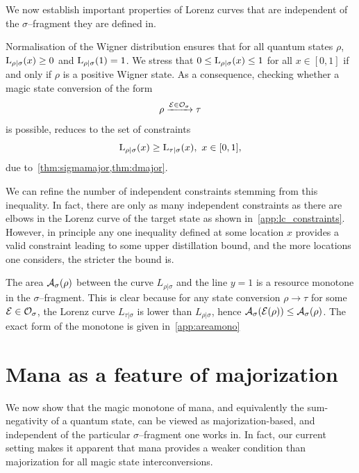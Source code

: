 \documentclass[pra,
aps,
twocolumn,
superscriptaddress,
groupedaddress,
nofootinbib,
reprint
]{revtex4-1}
\begin{document}
We now establish important properties of Lorenz curves that are independent of the $\sigma$--fragment they are defined in.

Normalisation of the Wigner distribution  ensures that for all quantum states $\rho$, ${{\rm{L}}_{\rho|\sigma}}(x) \geq 0$ and ${{\rm{L}}_{\rho|\sigma}}(1) = 1$.
We stress that $0 \leq {{\rm{L}}_{\rho|\sigma}}(x) \leq 1$ for all $x \in [0,1]$ if and only if $\rho$ is a positive Wigner state.
As a consequence, checking whether a magic state conversion of the form
\begin{equation}
	\rho \xrightarrow{\mathcal{E} \in \mathcal{O}_\sigma} \tau
\end{equation} 
is possible, reduces to the set of constraints
\begin{equation}\label{eq:majbound}
    {{\rm{L}}_{\rho|\sigma}}(x) \geq {{\rm{L}}_{\tau|\sigma}}(x),\ x\in [0,1],
\end{equation}
due to~\cref{thm:sigmamajor,thm:dmajor}.

We can refine the number of independent constraints stemming from this inequality. 
In fact, there are only as many independent constraints as there are elbows in the Lorenz curve of the target state as shown in~\cref{app:lc_constraints}.
However, in principle any one inequality defined at some location $x$ provides a valid constraint leading to some upper distillation bound, and the more locations one considers, the stricter the bound is.

The area ${\mathcal A}_\sigma(\rho)$ between the curve $L_{\rho|\sigma}$ and the line $y=1$ is a resource monotone in the $\sigma$--fragment. 
This is clear because for any state conversion $\rho \longrightarrow \tau$ for some $\mathcal{E} \in \mathcal{O}_\sigma$, the Lorenz curve $L_{\tau|\sigma}$ is lower than $L_{\rho|\sigma}$, hence ${\mathcal A}_\sigma(\mathcal{E}(\rho)) \leq {\mathcal A}_\sigma(\rho)$.
The exact form of the monotone is given in~\cref{app:areamono}


\section{Mana as a feature of majorization}

We now show that the magic monotone of mana, and equivalently the sum-negativity of a quantum state, can be viewed as majorization-based, and independent of the particular $\sigma$--fragment one works in.
In fact, our current setting makes it apparent that mana provides a weaker condition than majorization for all magic state interconversions.
\end{document}
